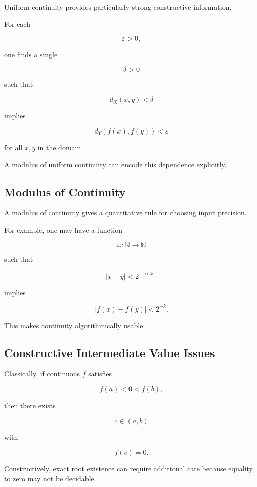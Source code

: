 Uniform continuity provides particularly strong constructive information.

For each

\[
\varepsilon>0,
\]

one finds a single

\[
\delta>0
\]

such that

\[
d_X(x,y)<\delta
\]

implies

\[
\boxed{
d_Y(f(x),f(y))<\varepsilon
}
\]

for all \(x,y\) in the domain.

A modulus of uniform continuity can encode this dependence explicitly.

\subsection{Modulus of Continuity}
\label{subsec:modulus-of-continuity}

A modulus of continuity gives a quantitative rule for choosing input
precision.

For example, one may have a function

\[
\omega:\mathbb{N}\to\mathbb{N}
\]

such that

\[
|x-y|<2^{-\omega(k)}
\]

implies

\[
\boxed{
|f(x)-f(y)|<2^{-k}.
}
\]

This makes continuity algorithmically usable.

\subsection{Constructive Intermediate Value Issues}
\label{subsec:constructive-intermediate-value}

Classically, if continuous \(f\) satisfies

\[
f(a)<0<f(b),
\]

then there exists

\[
c\in(a,b)
\]

with

\[
f(c)=0.
\]

Constructively, exact root existence can require additional care because
equality to zero may not be decidable.

